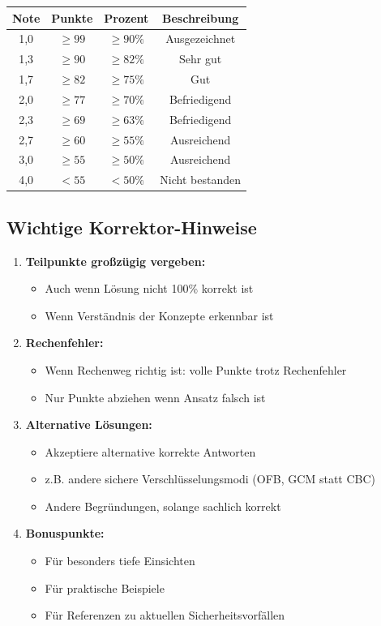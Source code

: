 \documentclass[12pt,a4paper]{article}
\begin{document}
\centering
\begin{tabular}{|c|c|c|c|}
    \hline
    \textbf{Note} & \textbf{Punkte} & \textbf{Prozent} & \textbf{Beschreibung} \\
    \hline
    1,0 & $\geq 99$ & $\geq 90\%$ & Ausgezeichnet \\
    1,3 & $\geq 90$ & $\geq 82\%$ & Sehr gut \\
    1,7 & $\geq 82$ & $\geq 75\%$ & Gut \\
    2,0 & $\geq 77$ & $\geq 70\%$ & Befriedigend \\
    2,3 & $\geq 69$ & $\geq 63\%$ & Befriedigend \\
    2,7 & $\geq 60$ & $\geq 55\%$ & Ausreichend \\
    3,0 & $\geq 55$ & $\geq 50\%$ & Ausreichend \\
    4,0 & $< 55$ & $< 50\%$ & Nicht bestanden \\
    \hline
\end{tabular}

\subsection*{Wichtige Korrektor-Hinweise}

\begin{enumerate}[1.]
    \item \textbf{Teilpunkte großzügig vergeben:}
    \begin{itemize}
        \item Auch wenn Lösung nicht 100\% korrekt ist
        \item Wenn Verständnis der Konzepte erkennbar ist
    \end{itemize}
    
    \item \textbf{Rechenfehler:}
    \begin{itemize}
        \item Wenn Rechenweg richtig ist: volle Punkte trotz Rechenfehler
        \item Nur Punkte abziehen wenn Ansatz falsch ist
    \end{itemize}
    
    \item \textbf{Alternative Lösungen:}
    \begin{itemize}
        \item Akzeptiere alternative korrekte Antworten
        \item z.B. andere sichere Verschlüsselungsmodi (OFB, GCM statt CBC)
        \item Andere Begründungen, solange sachlich korrekt
    \end{itemize}
    
    \item \textbf{Bonuspunkte:}
    \begin{itemize}
        \item Für besonders tiefe Einsichten
        \item Für praktische Beispiele
        \item Für Referenzen zu aktuellen Sicherheitsvorfällen
    \end{itemize}
\end{enumerate}
\end{document}
